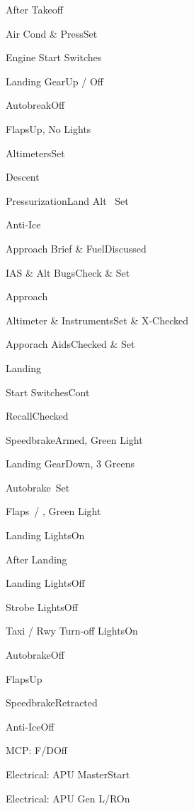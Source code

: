 \documentclass[sim-use]{checklist}
\begin{document}
\begin{checklist}{After Takeoff}
  \item{Air Cond \& Press}{Set}
  \item{Engine Start Switches}{\blank}
  \item{Landing Gear}{Up / Off}
  \item{Autobreak}{Off}
  \item{Flaps}{Up, No Lights}
  \item{Altimeters}{Set}
\end{checklist}

\begin{checklist}{Descent}
  \item{Pressurization}{Land Alt \blank\ Set}
  \item{Anti-Ice}{\blank}
  \item{Approach Brief \& Fuel}{Discussed}
  \item{IAS \& Alt Bugs}{Check \& Set}
\end{checklist}

\begin{checklist}{Approach}
  \item{Altimeter \& Instruments}{Set \& X-Checked}
  \item{Apporach Aids}{Checked \& Set}
\end{checklist}

\begin{checklist}{Landing}
  \item{Start Switches}{Cont}
  \item{Recall}{Checked}
  \item{Speedbrake}{Armed, Green Light}
  \item{Landing Gear}{Down, 3 Greens}
  \item{Autobrake}{\blank\ Set}
  \item{Flaps}{\blank\ / \blank, Green Light}
  \item{Landing Lights}{On}
\end{checklist}

\begin{checklist}{After Landing}
  \item{Landing Lights}{Off}
  \item{Strobe Lights}{Off}
  \item{Taxi / Rwy Turn-off Lights}{On}
  \item{Autobrake}{Off}
  \item{Flaps}{Up}
  \item{Speedbrake}{Retracted}
  \item{Anti-Ice}{Off}
  \item{MCP: F/D}{Off}
  \item{Electrical: APU Master}{Start}
  \item{Electrical: APU Gen L/R}{On}
\end{checklist}
\end{document}
